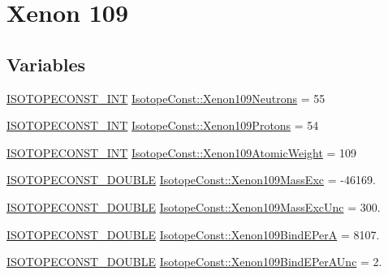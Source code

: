 \hypertarget{group___isotope_const-_xenon-_xe109}{}\section{Xenon 109}
\label{group___isotope_const-_xenon-_xe109}
\subsection*{Variables}
\begin{DoxyCompactItemize}
\item 
\mbox{\hyperlink{group___isotope_const-_macros_ga5f18360b3e99483a35c32d789e62621c}{I\+S\+O\+T\+O\+P\+E\+C\+O\+N\+S\+T\+\_\+\+I\+NT}} \mbox{\hyperlink{group___isotope_const-_xenon-_xe109_ga9c5a916f8a3e62faaac3f72147ff0b99}{Isotope\+Const\+::\+Xenon109\+Neutrons}} = 55
\item 
\mbox{\hyperlink{group___isotope_const-_macros_ga5f18360b3e99483a35c32d789e62621c}{I\+S\+O\+T\+O\+P\+E\+C\+O\+N\+S\+T\+\_\+\+I\+NT}} \mbox{\hyperlink{group___isotope_const-_xenon-_xe109_ga57c26e3478d15505efed997e387354d2}{Isotope\+Const\+::\+Xenon109\+Protons}} = 54
\item 
\mbox{\hyperlink{group___isotope_const-_macros_ga5f18360b3e99483a35c32d789e62621c}{I\+S\+O\+T\+O\+P\+E\+C\+O\+N\+S\+T\+\_\+\+I\+NT}} \mbox{\hyperlink{group___isotope_const-_xenon-_xe109_gaf75306c2c217faa3bd8338704ed15810}{Isotope\+Const\+::\+Xenon109\+Atomic\+Weight}} = 109
\item 
\mbox{\hyperlink{group___isotope_const-_macros_ga8f45a7272ce02c0b4c65c44636ed719a}{I\+S\+O\+T\+O\+P\+E\+C\+O\+N\+S\+T\+\_\+\+D\+O\+U\+B\+LE}} \mbox{\hyperlink{group___isotope_const-_xenon-_xe109_ga81a92bfbe5dd2c35fd24ab27782f489b}{Isotope\+Const\+::\+Xenon109\+Mass\+Exc}} = -\/46169.
\item 
\mbox{\hyperlink{group___isotope_const-_macros_ga8f45a7272ce02c0b4c65c44636ed719a}{I\+S\+O\+T\+O\+P\+E\+C\+O\+N\+S\+T\+\_\+\+D\+O\+U\+B\+LE}} \mbox{\hyperlink{group___isotope_const-_xenon-_xe109_gaf808f4a65ac4ec927363fafc56bc03fa}{Isotope\+Const\+::\+Xenon109\+Mass\+Exc\+Unc}} = 300.
\item 
\mbox{\hyperlink{group___isotope_const-_macros_ga8f45a7272ce02c0b4c65c44636ed719a}{I\+S\+O\+T\+O\+P\+E\+C\+O\+N\+S\+T\+\_\+\+D\+O\+U\+B\+LE}} \mbox{\hyperlink{group___isotope_const-_xenon-_xe109_gabf7c9df5ba4f5c9ac5e6953fd1303987}{Isotope\+Const\+::\+Xenon109\+Bind\+E\+PerA}} = 8107.
\item 
\mbox{\hyperlink{group___isotope_const-_macros_ga8f45a7272ce02c0b4c65c44636ed719a}{I\+S\+O\+T\+O\+P\+E\+C\+O\+N\+S\+T\+\_\+\+D\+O\+U\+B\+LE}} \mbox{\hyperlink{group___isotope_const-_xenon-_xe109_ga2dc1f877cea64f3ddd29541d49862292}{Isotope\+Const\+::\+Xenon109\+Bind\+E\+Per\+A\+Unc}} = 2.

\end{DoxyCompactItemize}
